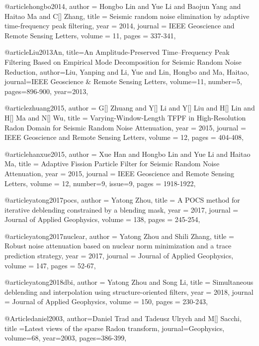 @article{hongbo2014,
  author =	 {Hongbo Lin and Yue Li and Baojun Yang and Haitao Ma and C[] Zhang},
  title =	 { Seismic random noise elimination by adaptive time-frequency peak filtering},
  year =	 2014,
  journal =	 {IEEE Geoscience and Remote Sensing Letters},
  volume =	 11,
  pages =	 {337-341},
}

@article{Liu2013An,
  title={An Amplitude-Preserved Time–Frequency Peak Filtering Based on Empirical Mode Decomposition for Seismic Random Noise Reduction},
  author={Liu, Yanping and Li, Yue and Lin, Hongbo and Ma, Haitao},
  journal={IEEE Geoscience & Remote Sensing Letters},
  volume={11},
  number={5},
  pages={896-900},
  year={2013},
}

@article{zhuang2015,
  author =	 {G[] Zhuang and Y[] Li and Y[] Liu and H[] Lin and H[] Ma and N[] Wu},
  title =	 {Varying-Window-Length {TFPF} in High-Resolution Radon Domain for Seismic Random Noise Attenuation},
  year =	 2015,
  journal =	 {IEEE Geoscience and Remote Sensing Letters},
  volume =	 12,
  pages =	 {404-408},
}

@article{hanxue2015,
  author =	 {Xue Han and Hongbo Lin and Yue Li and Haitao Ma},
  title =	 {Adaptive Fission Particle Filter for Seismic Random Noise Attenuation},
  year =	 2015,
  journal =	 {IEEE Geoscience and Remote Sensing Letters},
  volume =	 12,
  number=9,
  issue=9,
  pages =	 {1918-1922},
}

@article{yatong2017pocs,
  author =	 {Yatong Zhou},
  title =	 {A {POCS} method for iterative deblending constrained by a blending mask},
  year =	 2017,
  journal =	 {Journal of Applied Geophysics},
  volume =	 138,
  pages =	 {245-254},
}



@article{yatong2017nuclear,
  author =	 {Yatong Zhou and Shili Zhang},
  title =	 {Robust noise attenuation based on nuclear norm minimization and a trace prediction strategy},
  year =	 2017,
  journal =	 {Journal of Applied Geophysics},
  volume =	 147,
  pages =	 {52-67},
}

@article{yatong2018dbi,
  author =	 {Yatong Zhou and Song Li},
  title =	 {Simultaneous deblending and interpolation using structure-oriented filters},
  year =	 2018,
  journal =	 {Journal of Applied Geophysics},
  volume =	 150,
  pages =	 {230-243},
}

@Article{daniel2003,
  author={Daniel Trad and Tadeusz Ulrych and M[] Sacchi},
  title ={Latest views of the sparse {R}adon transform},
  journal={Geophysics},
  volume=68,
  year=2003,
  pages={386-399},
}

